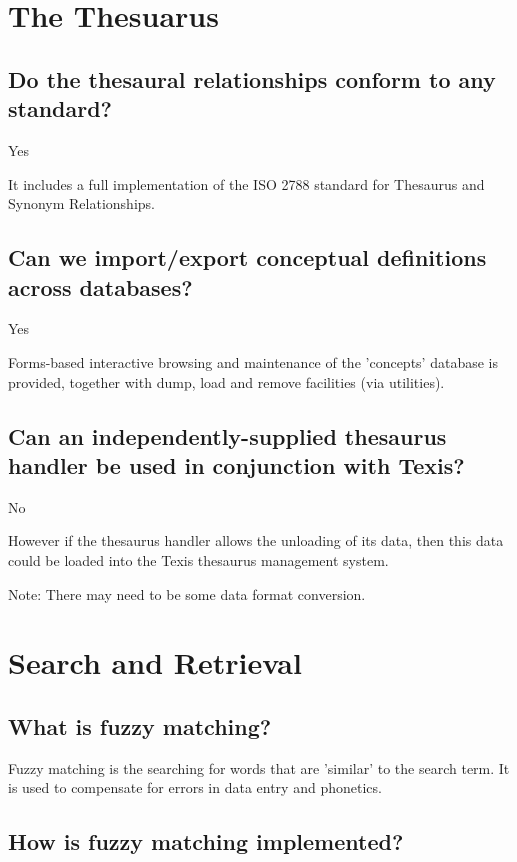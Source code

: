 \section{The Thesuarus}

\subsection{Do the thesaural relationships conform to any standard?}

Yes

It includes a full implementation of the ISO 2788 standard for Thesaurus and
Synonym Relationships.

\subsection{Can we import/export conceptual definitions across databases?}

Yes

Forms-based interactive browsing and maintenance of the 'concepts'
database is provided, together with dump, load and remove facilities (via
utilities).

\subsection{Can an independently-supplied thesaurus handler be used in conjunction with
Texis?}

No

However if the thesaurus handler allows the unloading of its data, then
this data could be loaded into the Texis thesaurus management system.

        Note: There may need to be some data format conversion.

\section{Search and Retrieval}


\subsection{What is fuzzy matching?}

Fuzzy matching is the searching for words that are 'similar' to the search term. It is
used to compensate for errors in data entry and phonetics.

\subsection{How is fuzzy matching implemented?}

